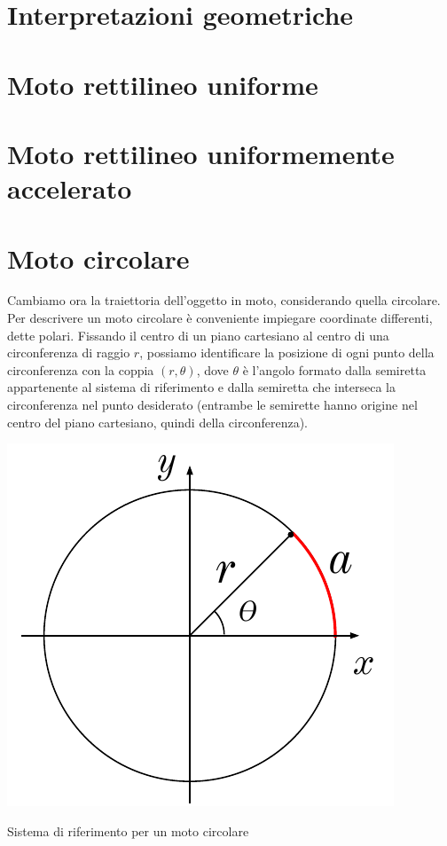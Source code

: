 \section{Interpretazioni geometriche}



\section{Moto rettilineo uniforme}


\section{Moto rettilineo uniformemente accelerato}



\section{Moto circolare}
Cambiamo ora la traiettoria dell'oggetto in moto, considerando quella circolare.
Per descrivere un moto circolare è conveniente impiegare coordinate differenti,
dette polari. Fissando il centro di un piano cartesiano al centro di una
circonferenza di raggio $r$, possiamo identificare la posizione di ogni punto
della circonferenza con la coppia $(r, \theta)$, dove $\theta$ è l'angolo
formato dalla semiretta appartenente al sistema di riferimento e dalla semiretta
che interseca la circonferenza nel punto desiderato (entrambe le semirette
hanno origine nel centro del piano cartesiano, quindi della circonferenza).

\begin{marginfigure}
    \centering
    \includegraphics[width = \marginparwidth]{figures/riferimentocirc.pdf}
    \caption{Sistema di riferimento per un moto circolare}
    \label{circref}
\end{marginfigure}

